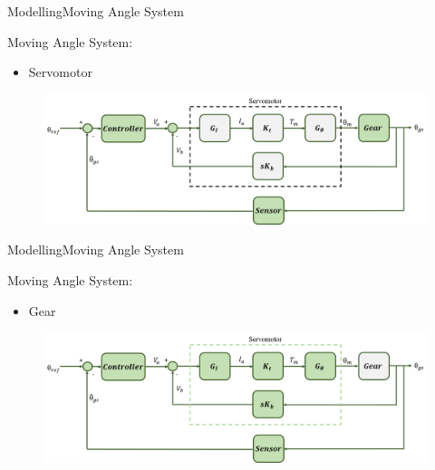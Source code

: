 \begin{frame}{Modelling}{Moving Angle System}
  \begin{block}{Moving Angle System:}

	  \begin{itemize}
	  	\item Servomotor
	  \end{itemize}

	  \begin{figure}
        \includegraphics[scale=0.26]{../report/figures/servo+gear+noise+servomotor.png}
      \end{figure}
  
  \end{block}
\end{frame}

\begin{frame}{Modelling}{Moving Angle System}
  \begin{block}{Moving Angle System:}
	  \begin{itemize}
	  	\item Gear
	  \end{itemize}
	  \begin{figure}
        \includegraphics[scale=0.26]{../report/figures/servo+gear+noise+gear.png}
      \end{figure}  
  \end{block}
\end{frame}

